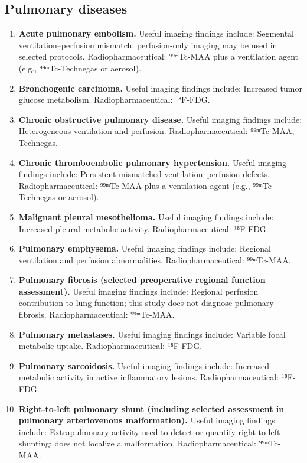 \subsection{Pulmonary diseases}
\begin{enumerate}[leftmargin=*,itemsep=0.45em,topsep=0.4em]
\item \textbf{Acute pulmonary embolism.} Useful imaging findings include: Segmental ventilation--perfusion mismatch; perfusion-only imaging may be used in selected protocols. Radiopharmaceutical: ⁹⁹ᵐTc-MAA plus a ventilation agent (e.g., ⁹⁹ᵐTc-Technegas or aerosol).
\item \textbf{Bronchogenic carcinoma.} Useful imaging findings include: Increased tumor glucose metabolism. Radiopharmaceutical: ¹⁸F-FDG.
\item \textbf{Chronic obstructive pulmonary disease.} Useful imaging findings include: Heterogeneous ventilation and perfusion. Radiopharmaceutical: ⁹⁹ᵐTc-MAA, Technegas.
\item \textbf{Chronic thromboembolic pulmonary hypertension.} Useful imaging findings include: Persistent mismatched ventilation--perfusion defects. Radiopharmaceutical: ⁹⁹ᵐTc-MAA plus a ventilation agent (e.g., ⁹⁹ᵐTc-Technegas or aerosol).
\item \textbf{Malignant pleural mesothelioma.} Useful imaging findings include: Increased pleural metabolic activity. Radiopharmaceutical: ¹⁸F-FDG.
\item \textbf{Pulmonary emphysema.} Useful imaging findings include: Regional ventilation and perfusion abnormalities. Radiopharmaceutical: ⁹⁹ᵐTc-MAA.
\item \textbf{Pulmonary fibrosis (selected preoperative regional function assessment).} Useful imaging findings include: Regional perfusion contribution to lung function; this study does not diagnose pulmonary fibrosis. Radiopharmaceutical: ⁹⁹ᵐTc-MAA.
\item \textbf{Pulmonary metastases.} Useful imaging findings include: Variable focal metabolic uptake. Radiopharmaceutical: ¹⁸F-FDG.
\item \textbf{Pulmonary sarcoidosis.} Useful imaging findings include: Increased metabolic activity in active inflammatory lesions. Radiopharmaceutical: ¹⁸F-FDG.
\item \textbf{Right-to-left pulmonary shunt (including selected assessment in pulmonary arteriovenous malformation).} Useful imaging findings include: Extrapulmonary activity used to detect or quantify right-to-left shunting; does not localize a malformation. Radiopharmaceutical: ⁹⁹ᵐTc-MAA.
\end{enumerate}

